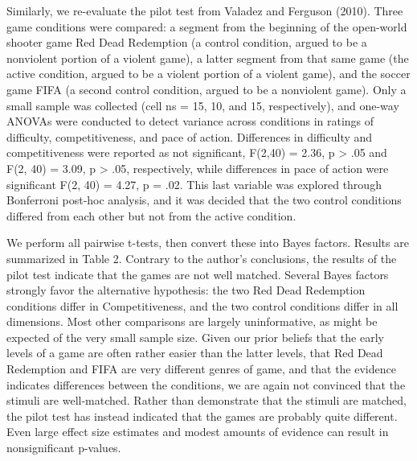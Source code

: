 \documentclass{article}
\begin{document}
Similarly, we re-evaluate the pilot test from Valadez and Ferguson (2010). Three game conditions were compared: a segment from the beginning of the open-world shooter game Red Dead Redemption (a control condition, argued to be a nonviolent portion of a violent game), a latter segment from that same game (the active condition, argued to be a violent portion of a violent game), and the soccer game FIFA (a second control condition, argued to be a nonviolent game). Only a small sample was collected (cell ns = 15, 10, and 15, respectively), and one-way ANOVAs were conducted to detect variance across conditions in ratings of difficulty, competitiveness, and pace of action. Differences in difficulty and competitiveness were reported as not significant, F(2,40) = 2.36, p > .05 and F(2, 40) = 3.09, p > .05, respectively, while differences in pace of action were significant F(2, 40) = 4.27, p = .02. This last variable was explored through Bonferroni post-hoc analysis, and it was decided that the two control conditions differed from each other but not from the active condition.

We perform all pairwise t-tests, then convert these into Bayes factors. Results are summarized in Table 2. Contrary to the author’s conclusions, the results of the pilot test indicate that the games are not well matched. Several Bayes factors strongly favor the alternative hypothesis: the two Red Dead Redemption conditions differ in Competitiveness, and the two control conditions differ in all dimensions. Most other comparisons are largely uninformative, as might be expected of the very small sample size. Given our prior beliefs that the early levels of a game are often rather easier than the latter levels, that Red Dead Redemption and FIFA are very different genres of game, and that the evidence indicates differences between the conditions, we are again not convinced that the stimuli are well-matched. Rather than demonstrate that the stimuli are matched, the pilot test has instead indicated that the games are probably quite different. Even large effect size estimates and modest amounts of evidence can result in nonsignificant p-values.
\end{document}

